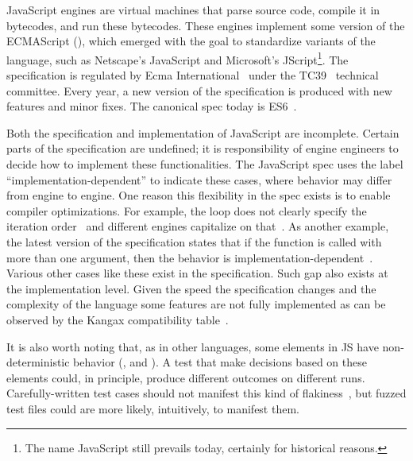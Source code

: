 \documentclass[10pt,conference,anonymous]{IEEEtran}
\begin{document}
JavaScript engines are virtual machines that parse source code,
compile it in bytecodes, and run these bytecodes. These engines
implement some version of the ECMAScript (\es{}), which emerged with
the goal to standardize variants of the language, such as Netscape's
JavaScript and Microsoft's JScript\footnote{The name JavaScript still
  prevails today, certainly for historical reasons.}. The \es{}
specification is regulated by Ecma International~\cite{es6-website}
under the TC39~\cite{tc39-github} technical committee.  Every year, a
new version of the \es{} specification is produced with new features
and minor fixes. The canonical spec today is
ES6~\cite{ecmas262-spec-repo,ecmas262-spec}.


Both the specification and implementation of JavaScript are
incomplete. Certain parts of the specification are undefined; it is
responsibility of engine engineers to decide how to implement these
functionalities. The JavaScript spec uses the label
``implementation-dependent'' to indicate these cases, where behavior
may differ from engine to engine. One reason this flexibility in the
spec exists is to enable compiler optimizations. For example, the
 loop does not clearly specify the iteration
order~\cite{so-forin-undefined,javascript-in-chrome} and different
engines capitalize on that~\cite{for-in-undefined}.  As another
example, the latest version of the \es{} specification states that if
the  function is called with more than
one argument, then the behavior is
implementation-dependent~\cite{es6-toPrecision}. Various other cases
like these exist in the specification. Such gap also exists at the
implementation level. Given the speed the specification changes and
the complexity of the language some features are not fully implemented
as can be observed by the Kangax compatibility table~\cite{kangax}.

\sloppy It is also worth noting that, as in other languages, some
elements in JS have non-deterministic behavior (\eg{},
 and ). A test that make decisions
based on these elements could, in principle, produce different
outcomes on different runs. Carefully-written test cases should not
manifest this kind of
flakiness~\cite{luo-etal-fse2014,palomba-zaidman-icsme2017}, but
fuzzed test files could are more likely, intuitively, to manifest
them.
\end{document}
